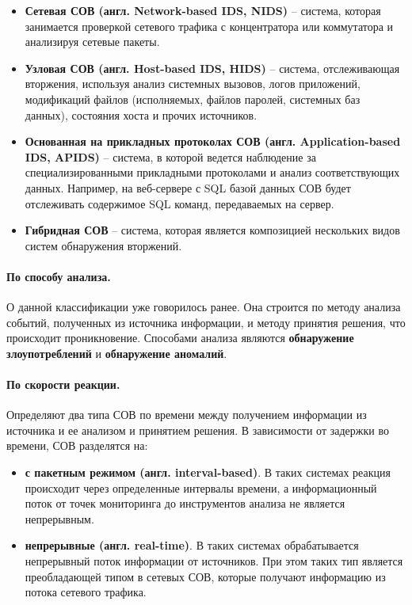 \begin{itemize}
	\item \textbf{Сетевая СОВ (англ. Network-based IDS, NIDS)} -- система, 
	которая занимается проверкой сетевого трафика с концентратора или коммутатора и 
	анализируя сетевые пакеты.

	\item \textbf{Узловая СОВ (англ. Host-based IDS, HIDS)} -- система, 
	отслеживающая вторжения, используя анализ системных вызовов, логов приложений, 
	модификаций файлов (исполняемых, файлов паролей, системных баз данных), состояния 
	хоста и прочих источников. 

	\item \textbf{Основанная на прикладных протоколах СОВ (англ. Application-based IDS, APIDS)} -- 
	система, в которой ведется наблюдение за специализированными прикладными протоколами 
	и анализ соответствующих данных. Например, на веб-сервере с SQL базой данных СОВ будет 
	отслеживать содержимое SQL команд, передаваемых на сервер.

	\item \textbf{Гибридная СОВ} -- система, которая является композицией нескольких видов 
	систем обнаружения вторжений.
\end{itemize}


\paragraph*{По способу анализа.}

О данной классификации уже говорилось ранее. Она строится по методу анализа событий, 
полученных из источника информации, и методу принятия решения, что происходит 
проникновение. Способами анализа являются \textbf{обнаружение злоупотреблений} и 
\textbf{обнаружение аномалий}.


\paragraph*{По скорости реакции.}

Определяют два типа СОВ по времени между получением информации из источника и ее 
анализом и принятием решения. В зависимости от задержки во времени, СОВ разделятся на:
\begin{itemize}
	\item \textbf{с пакетным режимом (англ. interval-based)}. В таких системах реакция 
	происходит через определенные интервалы времени, а информационный поток от точек 
	мониторинга до инструментов анализа не является непрерывным.

	\item \textbf{непрерывные (англ. real-time)}. В таких системах обрабатывается 
	непрерывный поток информации от источников. При этом таких тип является преобладающей 
	типом в сетевых СОВ, которые получают информацию из потока сетевого трафика.
\end{itemize}


